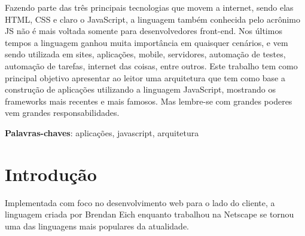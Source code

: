 \documentclass[
    article,            %
    11pt,               %
    oneside,            %
    a4paper,            %
    english,            %
    brazil,             %
    sumario=tradicional
    ]{abntex2}
\begin{document}
\frenchspacing 


%
%
\maketitle

\begin{resumoumacoluna}
Fazendo parte das três principais tecnologias que movem a internet, sendo elas HTML, CSS e claro o JavaScript, a linguagem também conhecida pelo acrônimo JS não é mais voltada somente para desenvolvedores front-end. Nos últimos tempos a linguagem ganhou muita importância em quaisquer cenários, e vem sendo utilizada em sites, aplicações, mobile, servidores, automação de testes, automação de tarefas, internet das coisas, entre outros. Este trabalho tem como principal objetivo apresentar ao leitor uma arquitetura que tem como base a construção de aplicações utilizando a linguagem JavaScript, mostrando os frameworks mais recentes e mais famosos. Mas lembre-se com grandes poderes vem grandes responsabilidades.
 
 \vspace{\onelineskip}
 
 \noindent
 \textbf{Palavras-chaves}: aplicações, javascript, arquitetura
\end{resumoumacoluna}


\textual

\section*{Introdução}

Implementada com foco no desenvolvimento web para o lado do
cliente, a linguagem criada por Brendan Eich enquanto trabalhou na Netscape se tornou
uma das linguagens mais populares da atualidade.
\end{document}
